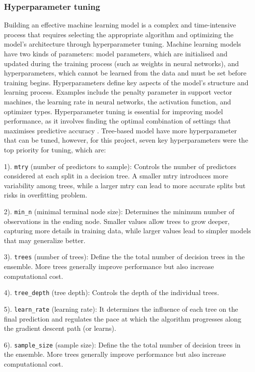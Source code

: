 \documentclass[11pt,a4paper,]{article}
\begin{document}
\subsubsection{Hyperparameter tuning}\label{hyperparameter-tuning}

Building an effective machine learning model is a complex and time-intensive process that requires selecting the appropriate algorithm and optimizing the model's architecture through hyperparameter tuning. Machine learning models have two kinds of parameters: model parameters, which are initialised and updated during the training process (such as weights in neural networks), and hyperparameters, which cannot be learned from the data and must be set before training begins. Hyperparameters define key aspects of the model's structure and learning process. Examples include the penalty parameter in support vector machines, the learning rate in neural networks, the activation function, and optimizer types. Hyperparameter tuning is essential for improving model performance, as it involves finding the optimal combination of settings that maximises predictive accuracy \autocite{YANG2020295}. Tree-based model have more hyperparameter that can be tuned, however, for this project, seven key hyperparameters were the top priority for tuning, which are:

1). \texttt{mtry} (number of predictors to sample): Controls the number of predictors considered at each split in a decision tree. A smaller mtry introduces more variability among trees, while a larger mtry can lead to more accurate splits but risks in overfitting problem.

2). \texttt{min\_n} (minimal terminal node size): Determines the minimum number of observations in the ending node. Smaller values allow trees to grow deeper, capturing more details in training data, while larger values lead to simpler models that may generalize better.

3). \texttt{trees} (number of trees): Define the the total number of decision trees in the ensemble. More trees generally improve performance but also increase computational cost.

4). \texttt{tree\_depth} (tree depth): Controls the depth of the individual trees.

5). \texttt{learn\_rate} (learning rate): It determines the influence of each tree on the final prediction and regulates the pace at which the algorithm progresses along the gradient descent path (or learns).

6). \texttt{sample\_size} (sample size): Define the the total number of decision trees in the ensemble. More trees generally improve performance but also increase computational cost.
\end{document}
